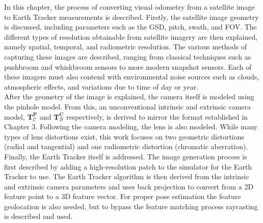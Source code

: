
In this chapter, the process of converting visual odometry from a satellite image to Earth Tracker measurements is described. Firstly, the satellite
image geometry is discussed, including parameters such as the GSD, pitch, swath, and FOV. The different types of resolution obtainable from satellite imagery
are then explained, namely spatial, temporal, and radiometric resolution. The various methods of capturing these images are described, ranging from 
classical techniques such as pushbroom and whiskbroom sensors to more modern snapshot sensors. Each of these imagers must also contend with environmental noise sources such as clouds, 
atmospheric effects, and variations due to time of day or year.\\

\noindent
After the geometry of the image is explained, the camera itself is modeled using the pinhole model. From this, an unconventional intrinsic and 
extrinsic camera model, $\mathbf{T}_\mathcal{C}^\mathbf{P}$ and $\mathbf{T}_\mathcal{B}^\mathbf{C}$ respectively, is derived to mirror the format established 
in Chapter 3. Following the camera modeling, the lens is also modeled. While many types of lens distortions exist, this work focuses on two geometric distortions 
(radial and tangential) and one radiometric distortion (chromatic aberration).\\

\noindent
Finally, the Earth Tracker itself is addressed. The image generation process is first described by adding a high-resolution patch to the 
simulator for the Earth Tracker to use. The Earth Tracker algorithm is then derived from the intrinsic and extrinsic camera parameters and uses back projection to convert
from a 2D feature point to a 3D feature vector. For proper pose estimation the feature geolocation is also needed, but to bypass the feature matching process raycasting is described
and used.




